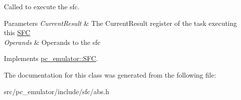 Called to execute the sfc. 


\begin{DoxyParams}{Parameters}
{\em Current\+Result} & The Current\+Result register of the task executing this \hyperlink{classpc__emulator_1_1SFC}{S\+FC} \\
\hline
{\em Operands} & Operands to the sfc \\
\hline
\end{DoxyParams}


Implements \hyperlink{classpc__emulator_1_1SFC_ab206c80fc0e429c56672b4f6a0ca8635}{pc\+\_\+emulator\+::\+S\+FC}.



The documentation for this class was generated from the following file\+:\begin{DoxyCompactItemize}
\item 
src/pc\+\_\+emulator/include/sfc/abs.\+h\end{DoxyCompactItemize}
